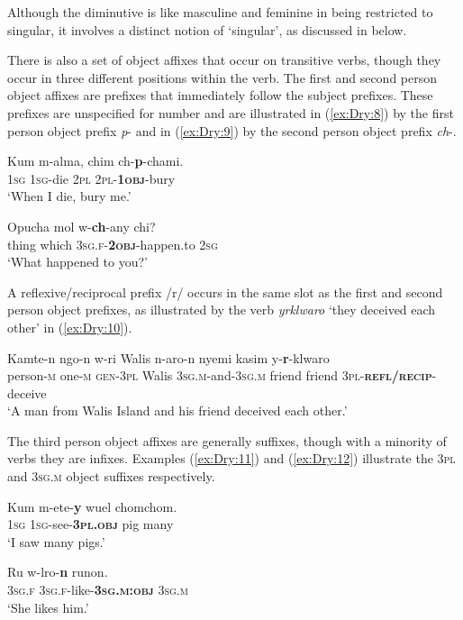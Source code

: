 \documentclass[output=collectionpaper]{langsci/langscibook}
\begin{document}
Although the diminutive is like masculine and feminine in being restricted to singular, it involves a distinct notion of `singular', as discussed in  below.

There is also a set of object affixes that occur on transitive verbs, though they occur in three different positions within the verb. The first and second person object affixes are prefixes that immediately follow the subject prefixes. These prefixes are unspecified for number and are illustrated in (\ref{ex:Dry:8}) by the first person object prefix \textit{p}{}- and in (\ref{ex:Dry:9}) by the second person object prefix \textit{ch}{}-.

\ea \label{ex:Dry:8}
\gll Kum	m-alma,	chim	ch-\textbf{p}-chami. \\
\textsc{1sg} \textsc{1sg}{}-die \textsc{2pl} \textsc{2pl}-\textbf{\textsc{1obj}}-bury\\
\glt `When I die, bury me.'
\z

\ea \label{ex:Dry:9}
\gll Opucha	mol	w-\textbf{ch}-any	chi?\\
thing which \textsc{3sg.f}-\textbf{\textsc{2obj}}-happen.to \textsc{2sg}\\
\glt `What happened to you?'
\z

A reflexive/reciprocal prefix /r/ occurs in the same slot as the first and second person object prefixes, as illustrated by the verb \textit{yrklwaro} `they deceived each other' in (\ref{ex:Dry:10}).

\ea \label{ex:Dry:10}
\gll Kamte-n	ngo-n	w-ri	Walis	n-aro-n nyemi	kasim	y-\textbf{r}-klwaro\\
person-\textsc{m} one-\textsc{m} \textsc{gen}-\textsc{3pl} Walis \textsc{3sg.m}-and-\textsc{3sg.m} friend friend \textsc{3pl}-\textbf{\textsc{refl/recip}}-deceive\\
\glt  `A man from Walis Island and his friend deceived each other.'
\z

The third person object affixes are generally suffixes, though with a minority of verbs they are infixes. Examples (\ref{ex:Dry:11}) and (\ref{ex:Dry:12}) illustrate the \textsc{3pl} and \textsc{3sg.m} object suffixes respectively.

\ea \label{ex:Dry:11}
\gll Kum	m-ete-\textbf{y}	wuel	chomchom.\\
\textsc{1sg} \textsc{1sg}-see-\textbf{\textsc{3pl.obj}} pig many\\
\glt `I saw many pigs.'
\z

\ea \label{ex:Dry:12}
\gll Ru	w-lro-\textbf{n}	runon.\\
\textsc{3sg.f} \textsc{3sg.f}-like-\textbf{\textsc{3sg.m:obj}} \textsc{3sg.m}\\
\glt `She likes him.'
\z
\end{document}
